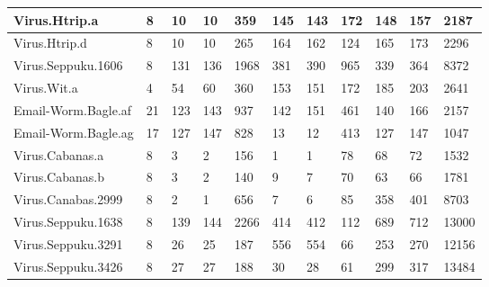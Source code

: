 \begin{small}
\begin{longtable}{|l|l|l|l|l|l|l|l|l|l|l|}
Virus.Htrip.a	&	8	&	10	&	10	&	359	&	145	&	143	&	172	&	148	&	157	&	2187	\\ \hline
Virus.Htrip.d	&	8	&	10	&	10	&	265	&	164	&	162	&	124	&	165	&	173	&	2296	\\ \hline
Virus.Seppuku.1606	&	8	&	131	&	136	&	1968	&	381	&	390	&	965	&	339	&	364	&	8372	\\ \hline
Virus.Wit.a	&	4	&	54	&	60	&	360	&	153	&	151	&	172	&	185	&	203	&	2641	\\ \hline
\hline 

Email-Worm.Bagle.af	&	21	&	123	&	143	&	937	&	142	&	151	&	461	&	140	&	166	&	2157	\\ \hline
Email-Worm.Bagle.ag	&	17	&	127	&	147	&	828	&	13	&	12	&	413	&	127	&	147	&	1047	\\ \hline
\hline 

Virus.Cabanas.a	&	8	&	3	&	2	&	156	&	1	&	1	&	78	&	68	&	72	&	1532	\\ \hline
Virus.Cabanas.b	&	8	&	3	&	2	&	140	&	9	&	7	&	70	&	63	&	66	&	1781	\\ \hline
Virus.Canabas.2999 &      8       &       2       &	1	&	656	&       7	&	6	&	85	&       358	&	401	&	8703	\\ \hline 
\hline 

Virus.Seppuku.1638	&	8	&	139	&	144	&	2266	&	414	&	412	&	112	&	689	&	712	&	13000	\\ \hline
Virus.Seppuku.3291	&	8	&	26	&	25	&	187	&	556	&	554	&	66	&	253	&	270	&	12156	\\ \hline
Virus.Seppuku.3426	&	8	&	27	&	27	&	188	&	30	&	28	&	61	&	299	&	317	&	13484	\\ \hline
\hline


\end{longtable}
\end{small}

